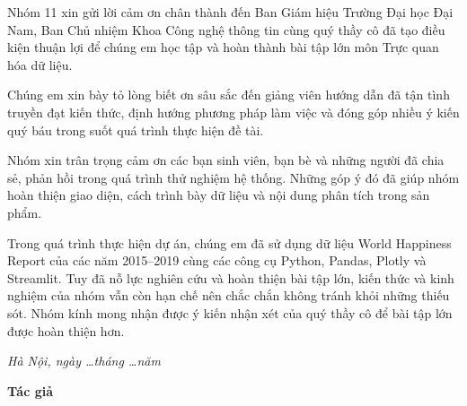 
Nhóm 11 xin gửi lời cảm ơn chân thành đến Ban Giám hiệu Trường Đại học Đại Nam, Ban Chủ nhiệm Khoa Công nghệ thông tin cùng quý thầy cô đã tạo điều kiện thuận lợi để chúng em học tập và hoàn thành bài tập lớn môn Trực quan hóa dữ liệu.

Chúng em xin bày tỏ lòng biết ơn sâu sắc đến giảng viên hướng dẫn  đã tận tình truyền đạt kiến thức, định hướng phương pháp làm việc và đóng góp nhiều ý kiến quý báu trong suốt quá trình thực hiện đề tài.

Nhóm xin trân trọng cảm ơn các bạn sinh viên, bạn bè và những người đã chia sẻ, phản hồi trong quá trình thử nghiệm hệ thống. Những góp ý đó đã giúp nhóm hoàn thiện giao diện, cách trình bày dữ liệu và nội dung phân tích trong sản phẩm.

Trong quá trình thực hiện dự án, chúng em đã sử dụng dữ liệu World Happiness Report của các năm 2015--2019 cùng các công cụ Python, Pandas, Plotly và Streamlit. Tuy đã nỗ lực nghiên cứu và hoàn thiện bài tập lớn, kiến thức và kinh nghiệm của nhóm vẫn còn hạn chế nên chắc chắn không tránh khỏi những thiếu sót. Nhóm kính mong nhận được ý kiến nhận xét của quý thầy cô để bài tập lớn được hoàn thiện hơn.

\vspace{1cm}

\begin{flushright}
\begin{minipage}{8cm}
\centering
\textit{Hà Nội, ngày \ldots tháng \ldots năm \Nam}

\vspace{0.5cm}

\textbf{Tác giả}

\vspace{2cm}

\textbf{\TenSinhVien}
\end{minipage}
\end{flushright}

